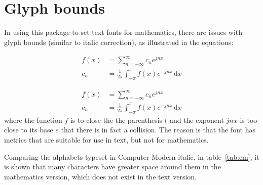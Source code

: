 \documentclass{ltxdockit}
\makeatletter
\def\topbottomrule{\noalign{\ifnum0=`}\fi
          \@aboverulesep=\aboverulesep
          \global\@belowrulesep=\belowrulesep
          \global\@thisruleclass=\@ne
          \@ifnextchar[{\@BTrule}{\@BTrule[\heavyrulewidth]}}
\makeatother
\begin{document}
\section{Glyph bounds}\label{sec:glyphbounds}

In using this package to set text fonts for mathematics, there are issues with glyph bounds (similar to italic correction), as illustrated in the equations:
\begin{example}
\begin{align}
 f(x) &= \sum_{n = -\infty}^\infty c_{n}e^{jnx}            \\
c_{n} &= \frac{1}{2π}\int_{-π}^{π}f(x)e^{-jnx}\,\mathrm dx
\end{align}
\end{example}
\begin{align}
f(x) &= \sum_{n = -\infty}^\infty c_{n}e^{jnx}\label{eq:1}\\
c_{n} &= \frac 1{2π}\int_{-π}^{π}f(x)e^{-jnx}\,\mathrm dx\label{eq:2}
\end{align}
where the function $f$ is to close the the parenthesis $($ and the exponent $jnx$ is too close to its base $e$ that there is in fact a collision. The reason is that the font has metrics that are suitable for use in text, but not for mathematics.

Comparing the alphabets typeset in Computer Modern italic, in table~\ref{tab:cm}, it is shown that many characters have greater space around them in the mathematics version, which does not exist in the text version.

\begin{table}
\caption{Computer Modern Italic in text and mathematics.\label{tab:cm}}
\end{table}
\end{document}
